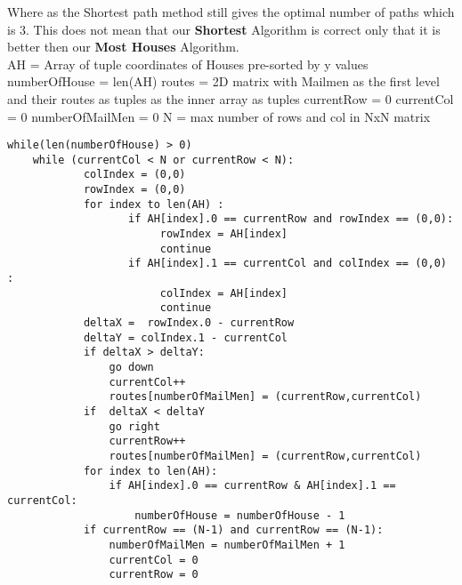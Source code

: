 \documentclass[10pt]{article}
\begin{document}
\hfill \break
\break
Where as the Shortest path method still gives the optimal number of paths which is 3. This does not mean that our  \textbf{Shortest} Algorithm is correct only that it is better then our \textbf{Most Houses} Algorithm.
\hfill \break
\break
\\
\newpage
\hfill \break
\break
AH = Array of tuple coordinates of Houses pre-sorted by y values
\newline
numberOfHouse = len(AH)
\newline
routes =  2D matrix with Mailmen as the first level and their routes as tuples as the inner array as tuples
\newline
currentRow = 0
\newline
currentCol = 0
\newline
numberOfMailMen = 0
\newline
N =  max number of rows and col in NxN matrix
\begin{lstlisting}
while(len(numberOfHouse) > 0)
    while (currentCol < N or currentRow < N):
            colIndex = (0,0)
            rowIndex = (0,0)
            for index to len(AH) :
                   if AH[index].0 == currentRow and rowIndex == (0,0):
                        rowIndex = AH[index]
                        continue
                   if AH[index].1 == currentCol and colIndex == (0,0) :
                        colIndex = AH[index]
                        continue
            deltaX =  rowIndex.0 - currentRow
            deltaY = colIndex.1 - currentCol
            if deltaX > deltaY:
                go down
                currentCol++
                routes[numberOfMailMen] = (currentRow,currentCol)
            if  deltaX < deltaY
                go right
                currentRow++
                routes[numberOfMailMen] = (currentRow,currentCol)
            for index to len(AH):
                if AH[index].0 == currentRow & AH[index].1 == currentCol:
                    numberOfHouse = numberOfHouse - 1
            if currentRow == (N-1) and currentRow == (N-1):
                numberOfMailMen = numberOfMailMen + 1
                currentCol = 0
                currentRow = 0
                
            



        
        
           
            
            
                
                
    
\end{lstlisting}
\end{document}
